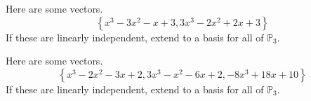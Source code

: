 \documentclass{ximera}
\begin{document}
\begin{problem}\label{prb:10.47} Here are some vectors.
\begin{equation*}
\left\{ x^{3}-3x^{2}-x+3,3x^{3}-2x^{2}+2x+3\right\}
\end{equation*}
If these are linearly independent, extend to a basis for all of $\mathbb{P}
_{3}$.
\end{problem}


\begin{problem}\label{prb:10.48} Here are some vectors.
\begin{equation*}
\left\{ x^{3}-2x^{2}-3x+2,3x^{3}-x^{2}-6x+2,-8x^{3}+18x+10\right\}
\end{equation*}
If these are linearly independent, extend to a basis for all of $\mathbb{P}
_{3}$.
\end{problem}






\end{document}
